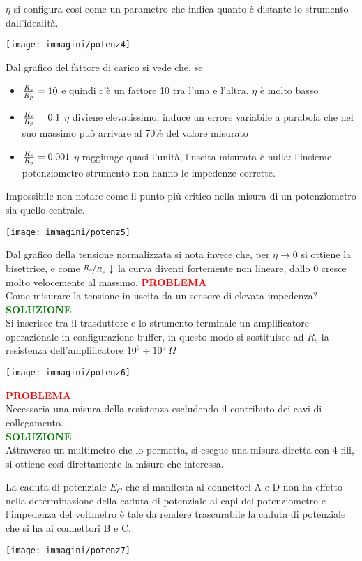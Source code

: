\documentclass[a4paper, 15pt]{article}
\begin{document}
\begin{adjustwidth}{2in}{}
	$\eta$ si configura così come un parametro che indica quanto è distante lo strumento dall'idealità.
	\begin{center}
		\texttt{[image: immagini/potenz4]}
	\end{center}
	Dal grafico del fattore di carico si vede che, se
	\begin{itemize}
		\item ${R_s\over R_p} = 10$ e quindi c'è un fattore 10 tra l'una e l'altra, $\eta$ è molto basso
		\item ${R_s\over R_p} = 0.1$ $\eta$ diviene elevatissimo, induce un errore variabile a parabola che nel suo massimo può arrivare al 70\% del valore misurato
		\item ${R_s\over R_p} = 0.001$ $\eta$ raggiunge quasi l'unità, l'uscita misurata è nulla: l'insieme potenziometro-strumento non hanno le impedenze corrette.
	\end{itemize}
	Impossibile non notare come il punto più critico nella misura di un potenziometro sia quello centrale.
	\begin{center}
	\texttt{[image: immagini/potenz5]}
	\end{center}
	Dal grafico della tensione normalizzata si nota invece che, per $\eta\rightarrow0$ si ottiene la bisettrice, e come $\nicefrac{R_s}{R_p}\downarrow$ la curva diventi fortemente non lineare, dallo 0 cresce molto velocemente al massimo.  
\newpage
	\textcolor{red}{\textbf{PROBLEMA}}\\
	Come misurare la tensione in uscita da un sensore di elevata impedenza? \\
	
	\textcolor{green}{\textbf{SOLUZIONE}}\\
	Si inserisce tra il trasduttore e lo strumento terminale un amplificatore operazionale in configurazione buffer, in questo modo si sostituisce ad $R_s$ la resistenza dell'amplificatore $10^6\div10^9~\Omega$
	\begin{center}
		\texttt{[image: immagini/potenz6]}
	\end{center}
	
	\textcolor{red}{\textbf{PROBLEMA}}\\
	Necessaria una misura della resistenza escludendo il contributo dei cavi di collegamento. \\
	
	\textcolor{green}{\textbf{SOLUZIONE}}\\
	Attraverso un multimetro che lo permetta, si esegue una misura diretta con 4 fili, si ottiene cosi direttamente la misure che interessa. 
	
	La caduta di potenziale $E_C$ che si manifesta ai connettori A e D non ha effetto nella determinazione della caduta di potenziale ai capi del potenziometro e l'impedenza del voltmetro è tale da rendere trascurabile la caduta di potenziale che
	si ha ai connettori B e C.
	\begin{center}
		\texttt{[image: immagini/potenz7]}
	\end{center}
\end{adjustwidth}
\newpage
\end{document}
